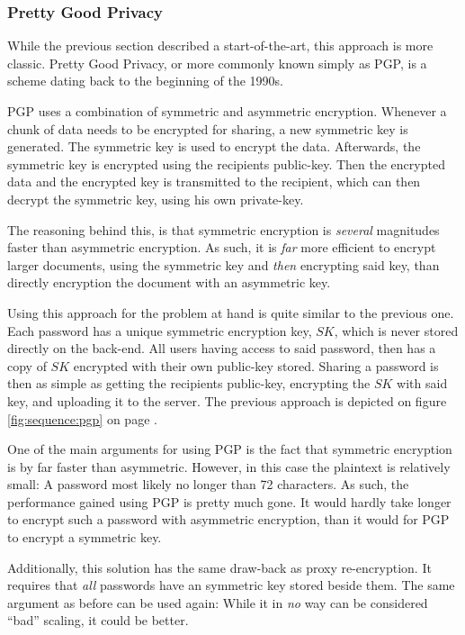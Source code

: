 			\subsubsection{Pretty Good Privacy}
				While the previous section described a start-of-the-art, this approach is more classic. Pretty Good Privacy, or more commonly known simply as PGP, is a scheme dating back to the beginning of the 1990s. 

				PGP uses a combination of symmetric and asymmetric encryption. Whenever a chunk of data needs to be encrypted for sharing, a new symmetric key is generated. The symmetric key is used to encrypt the data. Afterwards, the symmetric key is encrypted using the recipients public-key. Then the encrypted data and the encrypted key is transmitted to the recipient, which can then decrypt the symmetric key, using his own private-key. 

				The reasoning behind this, is that symmetric encryption is \emph{several} magnitudes faster than asymmetric encryption. As such, it is \emph{far} more efficient to encrypt larger documents, using the symmetric key and \emph{then} encrypting said key, than directly encryption the document with an asymmetric key.

				Using this approach for the problem at hand is quite similar to the previous one. Each password has a unique symmetric encryption key, $SK$, which is never stored directly on the back-end. All users having access to said password, then has a copy of $SK$ encrypted with their own public-key stored. Sharing a password is then as simple as getting the recipients public-key, encrypting the $SK$ with said key, and uploading it to the server. The previous approach is depicted on figure \ref{fig:sequence:pgp} on page \pageref{fig:sequence:pgp}.

				One of the main arguments for using PGP is the fact that symmetric encryption is by far faster than asymmetric. However, in this case the plaintext is relatively small: A password most likely no longer than 72 characters. As such, the performance gained using PGP is pretty much gone. It would hardly take longer to encrypt such a password with asymmetric encryption, than it would for PGP to encrypt a symmetric key.

				Additionally, this solution has the same draw-back as proxy re-encryption. It requires that \emph{all} passwords have an symmetric key stored beside them. The same argument as before can be used again: While it in \emph{no} way can be considered ``bad'' scaling, it could be better.

